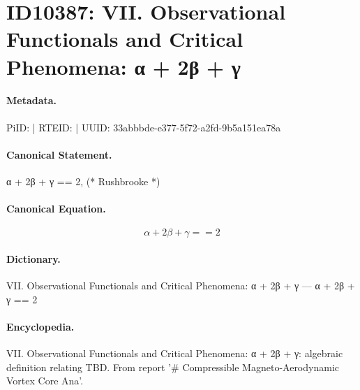 \section*{ID10387: VII. Observational Functionals and Critical Phenomena: α + 2β + γ}
\paragraph{Metadata.}
PiID:  | RTEID:  | UUID: 33abbbde-e377-5f72-a2fd-9b5a151ea78a

\paragraph{Canonical Statement.}
α + 2β + γ == 2, (* Rushbrooke *)

\paragraph{Canonical Equation.}
\[
α + 2β + γ == 2
\]

\paragraph{Dictionary.}
VII. Observational Functionals and Critical Phenomena: α + 2β + γ — α + 2β + γ == 2

\paragraph{Encyclopedia.}
VII. Observational Functionals and Critical Phenomena: α + 2β + γ: algebraic definition relating TBD. From report '\# Compressible Magneto-Aerodynamic Vortex Core Ana'.
